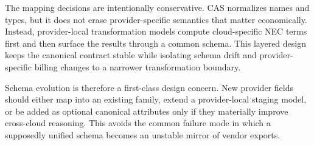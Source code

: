 The mapping decisions are intentionally conservative. CAS normalizes names and types, but it does not erase provider-specific semantics that matter economically. Instead, provider-local transformation models compute cloud-specific NEC terms first and then surface the results through a common schema. This layered design keeps the canonical contract stable while isolating schema drift and provider-specific billing changes to a narrower transformation boundary.

Schema evolution is therefore a first-class design concern. New provider fields should either map into an existing family, extend a provider-local staging model, or be added as optional canonical attributes only if they materially improve cross-cloud reasoning. This avoids the common failure mode in which a supposedly unified schema becomes an unstable mirror of vendor exports.
